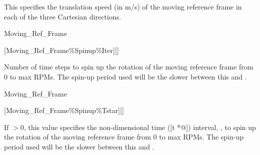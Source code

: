 \begin{nmldescbody}
This specifies the translation speed (in m\slash s) of the moving reference
frame in each of the three Cartesian directions.
\end{nmldescbody}


\begin{nmldescitem}
Moving_Ref_Frame%
\end{nmldescitem}
[Moving\_Ref\_Frame\%Spinup\%Iter][]

\begin{nmldescbody}
Number of time steps to spin up the rotation of the moving reference frame
from 0 to max RPMs.
%
The spin-up period used will be the slower between this and
.
\end{nmldescbody}


\begin{nmldescitem}
Moving_Ref_Frame%
\end{nmldescitem}
[Moving\_Ref\_Frame\%Spinup\%Tstar][]

\begin{nmldescbody}
If $>0$, this value specifies the non-dimensional time
([t *@\tstar]) interval, ,
to spin up the rotation of the moving reference frame from 0 to max RPMs.
%
The spin-up period used will be the slower between this and
.
\end{nmldescbody}


